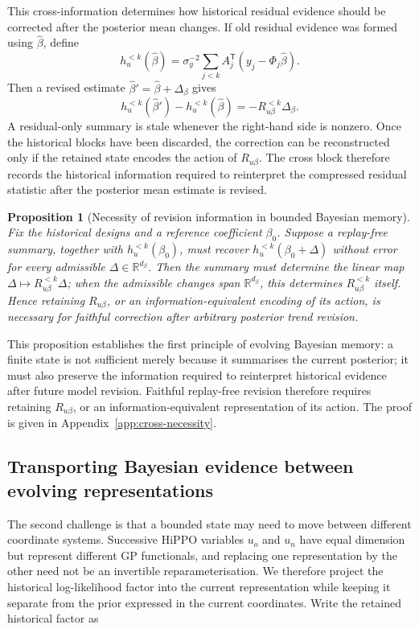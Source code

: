 \documentclass[twoside]{article}
\newcommand{\trans}{\mathsf T}
\newtheorem{proposition}{Proposition}
\begin{document}
This cross-information determines how historical residual evidence should be corrected after the posterior mean changes. If old residual evidence was formed using $\widehat\beta$, define
\[
 h_u^{<k}(\widehat\beta)=\sigma_y^{-2}\sum_{j<k}A_j^{\trans}(y_j-\Phi_j\widehat\beta).
\]
Then a revised estimate $\widehat\beta'=\widehat\beta+\Delta_\beta$ gives
\begin{equation}
 h_u^{<k}(\widehat\beta')-h_u^{<k}(\widehat\beta)
 =-R_{u\beta}^{<k}\Delta_\beta.
 \label{eq:stale}
\end{equation}
A residual-only summary is stale whenever the right-hand side is nonzero. Once the historical blocks have been discarded, the correction can be reconstructed only if the retained state encodes the action of $R_{u\beta}$. The cross block therefore records the historical information required to reinterpret the compressed residual statistic after the posterior mean estimate is revised.
\begin{proposition}[Necessity of revision information in bounded Bayesian memory]
\label{prop:cross-necessity}
Fix the historical designs and a reference coefficient $\beta_0$. Suppose a replay-free
summary, together with $h_u^{<k}(\beta_0)$, must recover
$h_u^{<k}(\beta_0+\Delta)$ without error for every admissible
$\Delta\in\mathbb R^{d_\beta}$. Then the summary must determine the linear map
$\Delta\mapsto R_{u\beta}^{<k}\Delta$; when the admissible changes span
$\mathbb R^{d_\beta}$, this determines $R_{u\beta}^{<k}$ itself. Hence retaining
$R_{u\beta}$, or an information-equivalent encoding of its action, is necessary
for faithful correction after arbitrary posterior trend revision.
\end{proposition}
This proposition establishes the first principle of evolving Bayesian memory: a finite state is not sufficient merely because it summarises the current posterior; it must also preserve the information required to reinterpret historical evidence after future model revision. Faithful replay-free revision therefore requires retaining $R_{u\beta}$, or an information-equivalent representation of its action. The proof is given in Appendix~\ref{app:cross-necessity}.

\subsection{Transporting Bayesian evidence between evolving representations}

The second challenge is that a bounded state may need to move between different coordinate systems. Successive HiPPO variables $u_o$ and $u_n$ have equal dimension but represent different GP functionals, and replacing one representation by the other need not be an invertible reparameterisation. We therefore project the historical log-likelihood factor into the current representation while keeping it separate from the prior expressed in the current coordinates. Write the retained historical factor as
\end{document}
